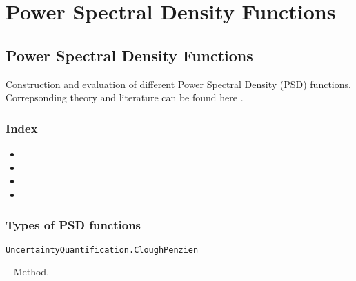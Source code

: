 \chapter{Power Spectral Density Functions}


\section{Power Spectral Density Functions}



\label{5658933604860497984}{}


Construction and evaluation of different Power Spectral Density (PSD) functions. Correpsonding theory and literature can be found here .



\subsection{Index}



\label{6663683553518785561}{}

\begin{itemize}
\item {}
\item {}
\item {}
\item {}
\end{itemize}


\subsection{Types of PSD functions}



\label{11019922910080293649}{}

\hypertarget{18058881860453401202}{\texttt{UncertaintyQuantification.CloughPenzien}}  -- {Method.}


